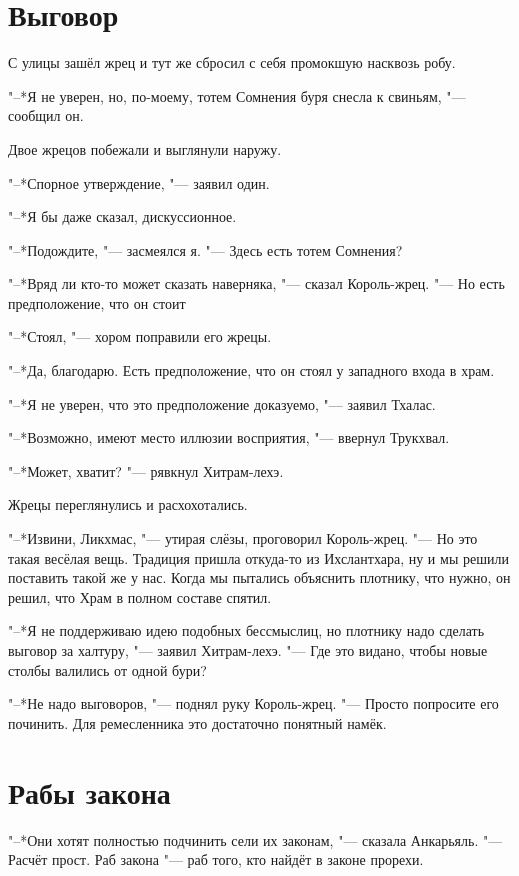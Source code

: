 \documentclass[a4paper,10pt]{book}
\newcommand{\ldotst}{\so{...}\xspace}
\begin{document}
\section{Выговор}
 
С улицы зашёл жрец и тут же сбросил с себя промокшую насквозь робу.

"--*Я не уверен, но, по-моему, тотем Сомнения буря снесла к свиньям, "--- 
сообщил он.

Двое жрецов побежали и выглянули наружу.

"--*Спорное утверждение, "--- заявил один.

"--*Я бы даже сказал, дискуссионное.

"--*Подождите, "--- засмеялся я. "--- Здесь есть тотем Сомнения?

"--*Вряд ли кто-то может сказать наверняка, "--- сказал Король-жрец. "--- Но 
есть предположение, что он стоит\ldotst

"--*Стоял, "--- хором поправили его жрецы.

"--*Да, благодарю. Есть предположение, что он стоял у западного входа в храм.

"--*Я не уверен, что это предположение доказуемо, "--- заявил Тхалас.

"--*Возможно, имеют место иллюзии восприятия, "--- ввернул Трукхвал.

"--*Может, хватит? "--- рявкнул Хитрам-лехэ.

Жрецы переглянулись и расхохотались.

"--*Извини, Ликхмас, "--- утирая слёзы, проговорил Король-жрец. "--- Но это 
такая весёлая вещь. Традиция пришла откуда-то из Ихслантхара, ну и мы решили 
поставить такой же у нас. Когда мы пытались объяснить плотнику, что нужно, он 
решил, что Храм в полном составе спятил.

"--*Я не поддерживаю идею подобных бессмыслиц, но плотнику надо сделать выговор 
за халтуру, "--- заявил Хитрам-лехэ. "--- Где это видано, чтобы новые столбы 
валились от одной бури?

"--*Не надо выговоров, "--- поднял руку Король-жрец. "--- Просто попросите его 
починить. Для ремесленника это достаточно понятный намёк.
 
\section{Рабы закона}

"--*Они хотят полностью подчинить сели их законам, "--- сказала Анкарьяль. "--- 
Расчёт прост. Раб закона "--- раб того, кто найдёт в законе прорехи.
\end{document}
